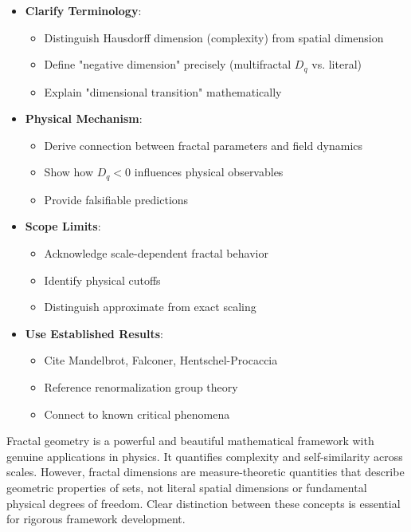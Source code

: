 \begin{itemize}
    \item \textbf{Clarify Terminology}:
    \begin{itemize}
        \item Distinguish Hausdorff dimension (complexity) from spatial dimension
        \item Define "negative dimension" precisely (multifractal $D_q$ vs. literal)
        \item Explain "dimensional transition" mathematically
    \end{itemize}

    \item \textbf{Physical Mechanism}:
    \begin{itemize}
        \item Derive connection between fractal parameters and field dynamics
        \item Show how $D_q < 0$ influences physical observables
        \item Provide falsifiable predictions
    \end{itemize}

    \item \textbf{Scope Limits}:
    \begin{itemize}
        \item Acknowledge scale-dependent fractal behavior
        \item Identify physical cutoffs
        \item Distinguish approximate from exact scaling
    \end{itemize}

    \item \textbf{Use Established Results}:
    \begin{itemize}
        \item Cite Mandelbrot, Falconer, Hentschel-Procaccia
        \item Reference renormalization group theory
        \item Connect to known critical phenomena
    \end{itemize}
\end{itemize}

Fractal geometry is a powerful and beautiful mathematical framework with genuine applications in physics. It quantifies complexity and self-similarity across scales. However, fractal dimensions are measure-theoretic quantities that describe geometric properties of sets, not literal spatial dimensions or fundamental physical degrees of freedom. Clear distinction between these concepts is essential for rigorous framework development.
